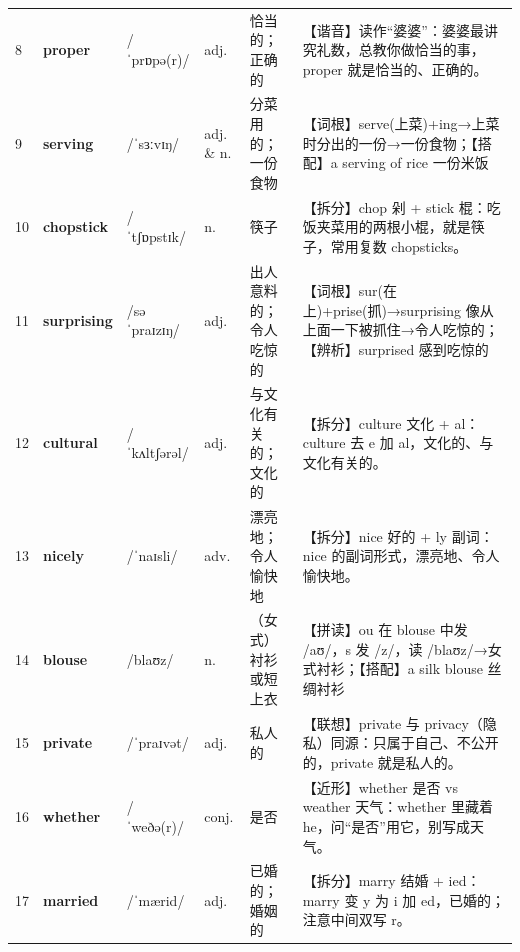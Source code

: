 \documentclass[UTF8,a4paper,11pt,oneside]{ctexbook}
\newcommand{\cellword}[1]{{\bfseries\textcolor{wordcol}{#1}}}
\newcommand{\cellipa}[1]{{\footnotesize\textcolor{ipacol}{#1}}}
\newcommand{\cellpos}[1]{\textcolor{poscol}{#1}}
\newcommand{\cellno}[1]{\textcolor{volcolor!75!black}{#1}}
\begin{document}
{\begin{longtable}{@{}C{0.045\textwidth}L{0.155\textwidth}L{0.175\textwidth}C{0.070\textwidth}L{0.180\textwidth}L{0.282\textwidth}@{}}
\cellno{8} & \cellword{proper} & \cellipa{/ˈprɒpə(r)/} & \cellpos{adj.} & 恰当的；正确的 & \textcolor{tagSound}{【谐音】}读作“婆婆”：婆婆最讲究礼数，总教你做恰当的事，proper 就是恰当的、正确的。 \\
 \cellno{9} & \cellword{serving} & \cellipa{/ˈsɜːvɪŋ/} & \cellpos{adj.  \& n.} & 分菜用的；一份食物 & \textcolor{tagRoot}{【词根】}serve(上菜)+ing→\allowbreak{}上菜时分出的一份→\allowbreak{}一份食物；\textcolor{tagColloc}{【搭配】}a serving of rice 一份米饭 \\
\cellno{10} & \cellword{chopstick} & \cellipa{/ˈtʃɒpstɪk/} & \cellpos{n.} & 筷子 & \textcolor{tagSplit}{【拆分】}chop 剁 + stick 棍：吃饭夹菜用的两根小棍，就是筷子，常用复数 chopsticks。 \\
 \cellno{11} & \cellword{surprising} & \cellipa{/səˈpraɪzɪŋ/} & \cellpos{adj.} & 出人意料的；令人吃惊的 & \textcolor{tagRoot}{【词根】}sur(在上)+prise(抓)→\allowbreak{}surprising 像从上面一下被抓住→\allowbreak{}令人吃惊的；\textcolor{tagDist}{【辨析】}surprised 感到吃惊的 \\
\cellno{12} & \cellword{cultural} & \cellipa{/ˈkʌltʃərəl/} & \cellpos{adj.} & 与文化有关的；文化的 & \textcolor{tagSplit}{【拆分】}culture 文化 + al：culture 去 e 加 al，文化的、与文化有关的。 \\
 \cellno{13} & \cellword{nicely} & \cellipa{/ˈnaɪsli/} & \cellpos{adv.} & 漂亮地；令人愉快地 & \textcolor{tagSplit}{【拆分】}nice 好的 + ly 副词：nice 的副词形式，漂亮地、令人愉快地。 \\
\cellno{14} & \cellword{blouse} & \cellipa{/blaʊz/} & \cellpos{n.} & （女式）衬衫或短上衣 & \textcolor{tagSpell}{【拼读】}ou 在 blouse 中发 /aʊ/，s 发 /z/，读 /blaʊz/→\allowbreak{}女式衬衫；\textcolor{tagColloc}{【搭配】}a silk blouse 丝绸衬衫 \\
 \cellno{15} & \cellword{private} & \cellipa{/ˈpraɪvət/} & \cellpos{adj.} & 私人的 & \textcolor{tagAssoc}{【联想】}private 与 privacy（隐私）同源：只属于自己、不公开的，private 就是私人的。 \\
\cellno{16} & \cellword{whether} & \cellipa{/ˈweðə(r)/} & \cellpos{conj.} & 是否 & \textcolor{tagNear}{【近形】}whether 是否 vs weather 天气：whether 里藏着 he，问“是否”用它，别写成天气。 \\
 \cellno{17} & \cellword{married} & \cellipa{/ˈmærid/} & \cellpos{adj.} & 已婚的；婚姻的 & \textcolor{tagSplit}{【拆分】}marry 结婚 + ied：marry 变 y 为 i 加 ed，已婚的；注意中间双写 r。 \\

\end{longtable}}
\end{document}
